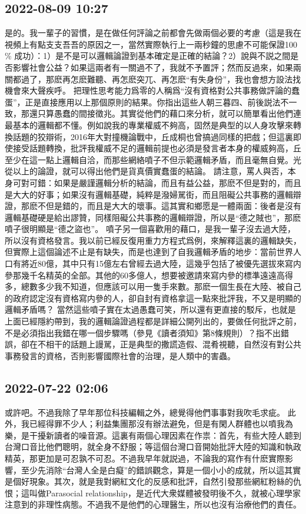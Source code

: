 \documentclass[twocolumn]{ctexart}
\begin{document}
\subsection*{2022-08-09 10:27}

是的。我一輩子的習慣，是在做任何評論之前都會先做兩個必要的考慮（這是我在視頻上有點支支吾吾的原因之一，當然實際執行上一兩秒鐘的思慮不可能保證100 \% 成功）：1）是不是可以邏輯論證到基本確定是正確的結論？2）說與不説之間是否影響社會公益？如果這兩者有一關過不了，我就不予置評；然而反過來，如果兩關都過了，那麽再怎麽難聽、再怎麽突兀、再怎麽“有失身份”，我也會想方設法找機會來大聲疾呼。
把理性思考能力爲零的人稱爲“沒有資格對公共事務做評論的蠢蛋”，正是直接應用以上那個原則的結果。你指出這些人朝三暮四、前後説法不一致，那還只算愚蠢的間接徵兆。其實從他們的藉口來分析，就可以簡單看出他們連最基本的邏輯都不懂。例如說我的專業權威不夠高，固然是典型的以人身攻擊來轉換話題的狡辯術，2016年大對撞機論戰中，丘成桐也曾搞過同樣的把戲；但這裏即使接受話題轉換，批評我權威不足的邏輯前提也必須是發言者本身的權威夠高，丘至少在這一點上邏輯自洽，而那些網絡噴子不但示範邏輯矛盾，而且毫無自覺。光從以上的論證，就可以得出他們是貨真價實蠢蛋的結論。
請注意，罵人與否，本身可對可錯：如果是嚴謹邏輯分析的結論，而且有益公益，那麽不但是對的，而且是大大的好事；如果沒有邏輯基礎，純粹是潑婦駡街，而且阻礙公共事務的邏輯辯證，那麽不但是錯的，而且是大大的壞事。這其實和鄉愿是一體兩面：後者是沒有邏輯基礎硬是給出謬贊，同樣阻礙公共事務的邏輯辯證，所以是“德之賊也”，那麽噴子很明顯是“德之盜也”。
噴子另一個喜歡用的藉口，是我一輩子沒去過大陸，所以沒有資格發言。我以前已經反復用重力方程式爲例，來解釋這裏的邏輯缺失，但實際上這個論述不止是有缺失，而是也達到了自我邏輯矛盾的地步：當前世界人口有將近80億，其中只有15億左右曾經去過大陸，這幾乎包括了被優先選拔來寫内參那幾千名精英的全部。其他的60多億人，想要被邀請來寫内參的標準遠遠高得多，總數多少我不知道，但應該可以用一隻手來數。那麽一個生長在大陸、被自己的政府認定沒有資格寫内參的人，卻自封有資格拿這一點來批評我，不又是明顯的邏輯矛盾嗎？
當然這些噴子實在太過愚蠢可笑，所以還有更直接的駁斥，也就是上面已經隱約帶到，我的邏輯論證過程都是詳細公開列出的，要做任何批評之前，不是必須指出我錯在哪一個步驟嗎（參見《讀者須知》第8條規則）？指不出錯誤，卻在不相干的話題上謾駡，正是典型的撒謊造假、混肴視聽，自然沒有對公共事務發言的資格，否則影響國際社會的治理，是人類中的害蟲。
\subsection*{2022-07-22 02:06}

或許吧。不過我除了早年那位科技編輯之外，總覺得他們事事對我吹毛求疵。
此外，我已經得罪不少人；利益集團那沒有辦法避免，但是有閑人群體也以噴我為樂，是干擾新讀者的噪音源。這裏有兩個心理因素在作祟：首先，有些大陸人聼到台灣口音比他們聰明，就全身不舒服；等這個台灣口音開始批評大陸的知識和執政精英，那更加是可忍孰不可忍。不過我早年就説過，不論我的寫作有什麽實際影響，至少先消除“台灣人全是白癡”的錯誤觀念，算是一個小小的成就，所以這其實是個好現象。其次，就是我對網紅文化的反感和批評，自然引發那些網紅粉絲的仇恨；這叫做Parasocial relationship，是近代大衆媒體被發明後不久，就被心理學家注意到的非理性病態。不過我不是他們的心理醫生，所以也沒有治療他們的責任。
\end{document}

